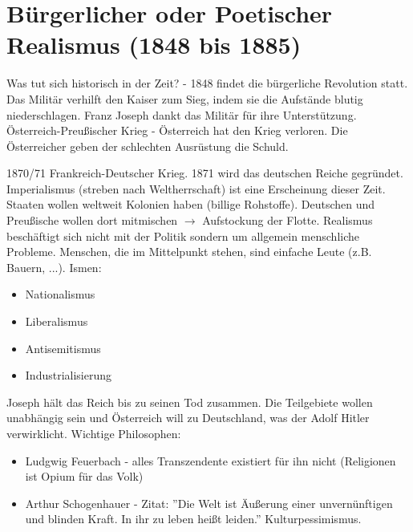 \documentclass[12pt,a4paper]{article}
\begin{document}
\section{Bürgerlicher oder Poetischer Realismus (1848 bis 1885)}

Was tut sich historisch in der Zeit? - 1848 findet die bürgerliche Revolution statt. Das Militär verhilft den Kaiser zum Sieg, indem sie die Aufstände blutig niederschlagen. Franz Joseph dankt das Militär für ihre Unterstützung. 
\newline
\newline
Österreich-Preußischer Krieg - Österreich hat den Krieg verloren. Die Österreicher geben der schlechten Ausrüstung die Schuld.

1870/71 Frankreich-Deutscher Krieg.
1871 wird das deutschen Reiche gegründet.
Imperialismus (streben nach Weltherrschaft) ist eine Erscheinung dieser Zeit. Staaten wollen weltweit Kolonien haben (billige Rohstoffe). Deutschen und Preußische wollen dort mitmischen $\rightarrow$ Aufstockung der Flotte.
\newline
\newline
Realismus beschäftigt sich nicht mit der Politik sondern um allgemein menschliche Probleme. Menschen, die im Mittelpunkt stehen, sind einfache Leute (z.B. Bauern, ...).
\newline
\newline
Ismen:
\begin{itemize}
\item Nationalismus
\item Liberalismus
\item Antisemitismus
\item Industrialisierung
\end{itemize}

Joseph hält das Reich bis zu seinen Tod zusammen. Die Teilgebiete wollen unabhängig sein und Österreich will zu Deutschland, was der Adolf Hitler verwirklicht.
\newline
\newline
Wichtige Philosophen:
\begin{itemize}
\item Ludgwig Feuerbach - alles Transzendente existiert für ihn nicht (Religionen ist Opium für das Volk)
\item Arthur Schogenhauer - Zitat: ''Die Welt ist Äußerung einer unvernünftigen und  blinden Kraft. In ihr zu leben heißt leiden.'' Kulturpessimismus.
\end{itemize}
\end{document}
